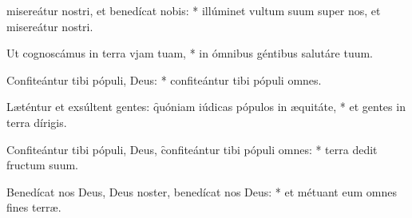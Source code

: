 \begin{psalmus}

 misereátur nostri, et benedícat nobis: * illúminet vultum suum super nos, et misereátur nostri.

Ut cognoscámus in terra vjam tuam, * in ómnibus géntibus salutáre tuum.

Confiteántur tibi pópuli, Deus: * confiteántur tibi pópuli omnes.

Læténtur et exsúltent gentes: \f quóniam iúdicas pópulos in æquitáte, * et gentes in terra dírigis.

Confiteántur tibi pópuli, Deus, \f confiteántur tibi pópuli omnes: * terra dedit fructum suum.

Benedícat nos Deus, Deus noster, benedícat nos Deus: * et métuant eum omnes fines terræ.
        
\end{psalmus}
